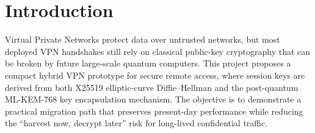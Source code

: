 \section{Introduction}
\justifying
Virtual Private Networks protect data over untrusted networks, but most
deployed VPN handshakes still rely on classical public-key cryptography that
can be broken by future large-scale quantum computers. This project proposes a
compact hybrid VPN prototype for secure remote access, where session keys are
derived from both X25519 elliptic-curve Diffie--Hellman and the post-quantum
ML-KEM-768 key encapsulation mechanism. The objective is to demonstrate a
practical migration path that preserves present-day performance while reducing
the ``harvest now, decrypt later'' risk for long-lived confidential traffic.
